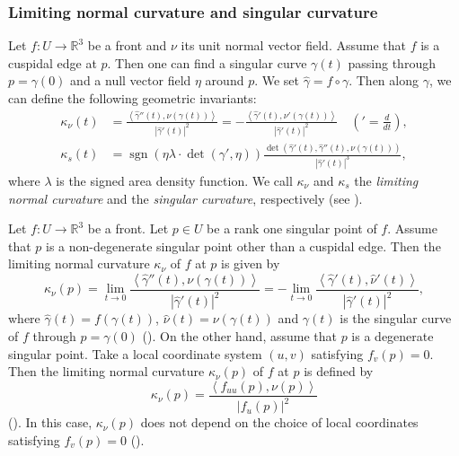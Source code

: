 \documentclass[11pt,a4paper,pdflatex,final]{amsart}
\theoremstyle{plain}
\theoremstyle{definition}
\theoremstyle{remark}
\newcommand{\sgn}{\operatorname{sgn}}
\newcommand{\0}{\bm{0}}
\newcommand{\R}{\mathbb{R}}
\newcommand{\inner}[2]{\left\langle{#1},{#2}\right\rangle}
\numberwithin{equation}{section}
\begin{document}
\subsubsection{Limiting normal curvature and singular curvature} 
Let $f\colon U\to\R^3$ be a front and $\nu$ its unit normal vector {field}. 
Assume that $f$ is a cuspidal edge at $p$. 
Then one can find a singular curve $\gamma(t)$ passing through $p=\gamma(0)$ 
and a null vector field $\eta$ around $p$. 
We set $\hat{\gamma}=f\circ \gamma$. 
Then along $\gamma$, we can define the following geometric invariants: 
\begin{equation}\label{eq:invariants}
\begin{aligned}
	\kappa_\nu(t)&=\frac{\inner{\hat{\gamma}''(t)}{\nu(\gamma(t))}}{|\hat{\gamma}'(t)|^2}
	=-\frac{\inner{\hat{\gamma}'(t)}{\nu'(\gamma(t))}}{|\hat{\gamma}'(t)|^2}\quad 
	{\left('=\frac{d}{dt}\right)},\\ 
	\kappa_s(t)&=\sgn(\eta\lambda\cdot\det(\gamma',\eta))
	\frac{\det(\hat{\gamma}'(t),\hat{\gamma}''(t),\nu(\gamma(t)))}{|\hat{\gamma}'(t)|^3},
\end{aligned}
\end{equation}
where $\lambda$ is the signed area density function. 
We call $\kappa_\nu$ and $\kappa_s$ the \textit{limiting normal curvature} 
and the \textit{singular curvature}, respectively (see \cite{ms,msuy,suy-front,usy-book}). 


{
Let $f\colon U\to\R^3$ be a front. 
Let $p\in U$ be a rank one singular point of $f$. 
Assume that $p$ is a non-degenerate singular point other than a cuspidal edge. 
Then the limiting normal curvature $\kappa_\nu$ of $f$ at $p$ 
is given by 
\begin{equation}\label{eq:kn-nondeg}
	\kappa_\nu(p)=\lim_{t\to0}\frac{\inner{\hat{\gamma}''(t)}{\nu(\gamma(t))}}{|\hat{\gamma}'(t)|^2}
	=-\lim_{t\to0}\frac{\inner{\hat{\gamma}'(t)}{\hat{\nu}'(t)}}{|\hat{\gamma}'(t)|^2},
\end{equation}
where $\hat{\gamma}(t)=f(\gamma(t))$, $\hat{\nu}(t)=\nu(\gamma(t))$ 
and $\gamma(t)$ is the singular curve of $f$ through $p=\gamma(0)$ 
(\cite[Proposition 2.9]{msuy}). 
On the other hand, assume that $p$ is a degenerate singular point. 
Take a local coordinate system $(u,v)$ satisfying $f_v(p)=0$. 
Then the limiting normal curvature $\kappa_\nu(p)$ of $f$ at $p$ is defined by 
\begin{equation}\label{eq:kn-deg}
	\kappa_\nu(p)=\frac{\inner{f_{uu}(p)}{\nu(p)}}{|f_u(p)|^2}
\end{equation}
(\cite[(2.2)]{msuy}). 
In this case, $\kappa_\nu(p)$ does not depend on the choice 
of local coordinates satisfying $f_v(p)=0$ (\cite[Proposition 2.9]{msuy}). 
}
\end{document}
